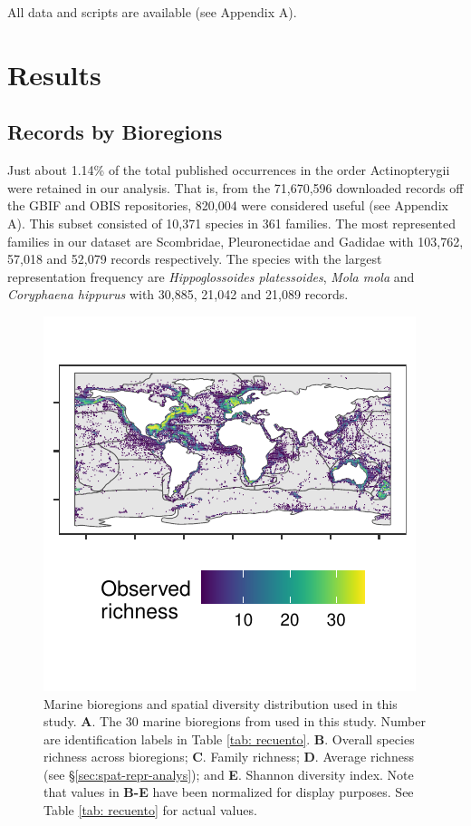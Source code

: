\documentclass[12pt,authoryear]{elsarticle}
\begin{document}
All data and scripts are available (see Appendix A).


 \section{Results}

\subsection{Records by Bioregions}
\label{sec:cleaned-data}

Just about 1.14\% of the total published occurrences in the order Actinopterygii were retained in our analysis. That is, from the 71,670,596 downloaded records off the GBIF and OBIS repositories, 820,004 were considered useful (see Appendix A). This subset consisted of 10,371 species in 361 families. The most represented families in our dataset are Scombridae, Pleuronectidae and Gadidae with 103,762, 57,018 and 52,079 records respectively. The species with the largest representation frequency are \textit{Hippoglossoides platessoides}, \textit{Mola mola} and \textit{Coryphaena hippurus} with 30,885, 21,042 and 21,089 records. 

\begin{figure}
  \centering
  \includegraphics[width=\textwidth]{Fig1}
   \caption{Marine bioregions and spatial diversity distribution used in this study.  \textsf{ \textbf{A}}. The 30 marine bioregions from \cite{costello2017marine} used in this study. Number are identification labels in Table \ref{tab: recuento}. \textsf{\textbf{B}}. Overall species richness across bioregions; \textsf{\textbf{C}}. Family richness; \textsf{\textbf{D}}. Average richness (see \S \ref{sec:spat-repr-analys}); and \textsf{\textbf{E}}. Shannon diversity index. Note that values in \textbf{B-E} have been normalized for display purposes. See Table \ref{tab: recuento} for actual values. }
    \label{fig:Data}
\end{figure}
\end{document}
